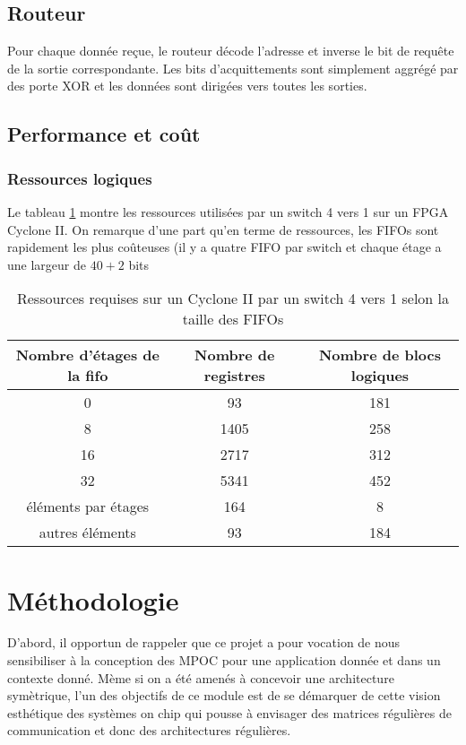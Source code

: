 \documentclass[11pt]{article}
\begin{document}
\subsection{Routeur}

Pour chaque donnée reçue, le routeur décode l'adresse et inverse le bit de requête de la sortie correspondante. Les bits d'acquittements sont simplement aggrégé par des porte XOR et les données sont dirigées vers toutes les sorties.

\subsection{Performance et coût}

\subsubsection{Ressources logiques}
Le tableau \ref{perfs-sw-4} montre les ressources utilisées par un switch 4 vers 1 sur un FPGA Cyclone II. On remarque d'une part qu'en terme de ressources, les FIFOs sont rapidement les plus coûteuses (il y a quatre FIFO par switch et chaque étage a une largeur de $40+2$ bits

\begin{table}
\centering
\begin{tabular}{|c|c|c|}
\hline
Nombre d'étages de la fifo & Nombre de registres & Nombre de blocs logiques \\
\hline
0 & 93 & 181 \\
8 & 1405 & 258 \\
16 &  2717 & 312 \\
32 & 5341 & 452 \\
\hline \hline
éléments par étages & 164 & 8 \\
autres éléments & 93 & 184 \\
\hline
\end{tabular}
\caption{Ressources requises sur un Cyclone II par un switch 4 vers 1 selon la taille des FIFOs}
\label{perfs-sw-4}
\end{table}

\section{Méthodologie}

D'abord, il opportun de rappeler que ce projet a pour vocation de nous sensibiliser à la conception des MPOC pour une application donnée et dans un contexte donné. Mème si on a été amenés à concevoir une architecture symètrique, l'un des objectifs de ce module est de se démarquer de cette vision esthétique des systèmes on chip qui pousse à envisager des matrices régulières de communication et donc des architectures régulières.  
\end{document}
